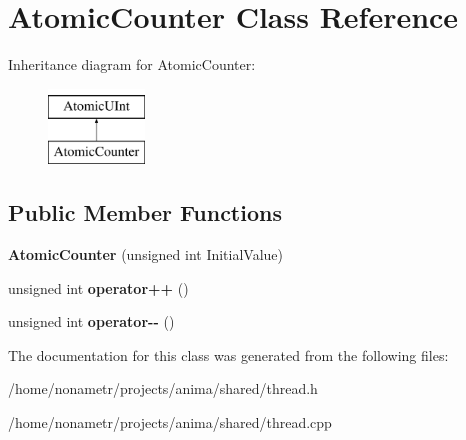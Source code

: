 \hypertarget{classAtomicCounter}{
\section{AtomicCounter Class Reference}
\label{classAtomicCounter}
}
Inheritance diagram for AtomicCounter:\begin{figure}[H]
\begin{center}
\leavevmode
\includegraphics[height=2.000000cm]{classAtomicCounter}
\end{center}
\end{figure}
\subsection*{Public Member Functions}
\begin{DoxyCompactItemize}
\item 
\hypertarget{classAtomicCounter_a7ac0a9d0ea94c1d44085643b013e6691}{
{\bfseries AtomicCounter} (unsigned int InitialValue)}
\label{classAtomicCounter_a7ac0a9d0ea94c1d44085643b013e6691}

\item 
\hypertarget{classAtomicCounter_a67e47216267c256c7236b2612969a2b1}{
unsigned int {\bfseries operator++} ()}
\label{classAtomicCounter_a67e47216267c256c7236b2612969a2b1}

\item 
\hypertarget{classAtomicCounter_a464033cba228a18de3b93344b131a638}{
unsigned int {\bfseries operator-\/-\/} ()}
\label{classAtomicCounter_a464033cba228a18de3b93344b131a638}

\end{DoxyCompactItemize}


The documentation for this class was generated from the following files:\begin{DoxyCompactItemize}
\item 
/home/nonametr/projects/anima/shared/thread.h\item 
/home/nonametr/projects/anima/shared/thread.cpp\end{DoxyCompactItemize}
